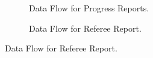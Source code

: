 \documentclass[12pt]{article}
\begin{document}
\begin{figure}
\begin{subfigure}[p]{0.47\textwidth}
\centering	
{}
\caption{Data Flow for Progress Reports.}
\end{subfigure}

\begin{subfigure}[p]{0.47\textwidth}
\centering	
{}
\caption{Data Flow for Referee Report.}
\end{subfigure}


\end{figure}
\end{document}
